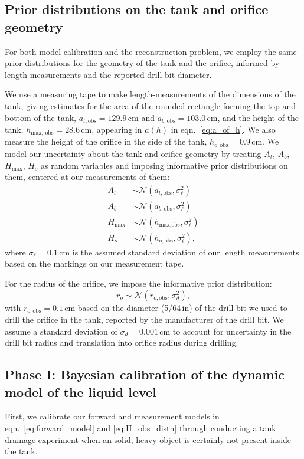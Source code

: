 \documentclass[openacc]{rsproca_new}%
\begin{document}
\subsection{Prior distributions on the tank and orifice geometry}
For both model calibration and the reconstruction problem, we employ the same prior distributions for the geometry of the tank and the orifice, informed by length-measurements and the reported drill bit diameter.

We use a measuring tape to make length-measurements of the dimensions of the tank, giving estimates for the area of the rounded rectangle forming the top and bottom of the tank, $a_{t, \text{obs}}=129.9$\,cm and $a_{b, \text{obs}}=103.0$\,cm, and the height of the tank, $h_{\text{max, obs}}=28.6$\,cm, appearing in $a(h)$ in eqn.~\ref{eq:a_of_h}. We also measure the height of the orifice in the side of the tank, $h_{o, \text{obs}}=0.9$\,cm. We model our uncertainty about the tank and orifice geometry by treating $A_t$, $A_b$, $H_{\text{max}}$, $H_o$ as random variables and imposing informative prior distributions on them, centered at our measurements of them:
\begin{align}
A_t &\sim \mathcal{N}(a_{t, \text{obs}}, \sigma_\ell^2) \\
A_b &\sim \mathcal{N}(a_{b, \text{obs}}, \sigma_\ell^2) \\
H_{\text{max}} &\sim \mathcal{N}(h_{\text{max}, \text{obs}}, \sigma_\ell^2) \\
H_o &\sim \mathcal{N}(h_{o, \text{obs}}, \sigma_\ell^2),
\end{align}
where $\sigma_\ell=0.1$\,cm is the assumed standard deviation of our length measurements based on the markings on our measurement tape.

For the radius of the orifice, we impose the informative prior distribution:
\begin{equation}
r_o \sim \mathcal{N}(r_{o, \text{obs}}, \sigma_d^2),
\end{equation}
with $r_{o, \text{obs}}=0.1$\,cm based on the diameter (5/64\,in) of the drill bit we used to drill the orifice in the tank, reported by the manufacturer of the drill bit. We assume a standard deviation of $\sigma_d= 0.001$\,cm to account for uncertainty in the drill bit radius and translation into orifice radius during drilling.

\subsection{Phase I: Bayesian calibration of the dynamic model of the liquid level}
First, we calibrate our forward and measurement models in eqn.~\ref{eq:forward_model} and \ref{eq:H_obs_distn} through conducting a tank drainage experiment when an solid, heavy object is certainly not present inside the tank.
\end{document}

